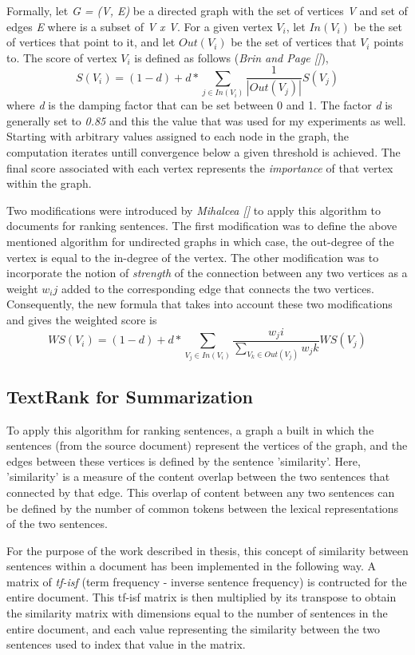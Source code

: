 Formally, let \emph{G = (V, E)} be a directed graph with the set of vertices \emph{V} and set of edges \emph{E} where is a subset of \emph{{V x V}}.
For a given vertex \(V_i\), let \(In(V_i)\) be the set of vertices that point to it, and let \(Out(V_i)\) be the set of vertices that \(V_i\) points to.
The score of vertex \(V_i\) is defined as follows (\emph{Brin and Page []}),
\[S(V_i) = (1 - d) + d * \sum_{j \in In(V_i)} \frac{1}{|Out(V_j)|}S(V_j)\]
where \emph{d} is the damping factor that can be set between 0 and 1.
The factor \emph{d} is generally set to \emph{0.85} and this the value that was used for my experiments as well.
Starting with arbitrary values assigned to each node in the graph, the computation iterates untill convergence below a given threshold is achieved.
The final score associated with each vertex represents the \textit{importance} of that vertex within the graph.

Two modifications were introduced by \emph{Mihalcea []} to apply this algorithm to documents for ranking sentences.
The first modification was to define the above mentioned algorithm for undirected graphs in which case, the out-degree of the vertex is equal to the in-degree of the vertex.
The other modification was to incorporate the notion of \textit{strength} of the connection between any two vertices as a weight \(w_ij\) added to the corresponding edge that connects the two vertices.
Consequently, the new formula that takes into account these two modifications and gives the weighted score is
\[WS(V_i) = (1 - d) + d * \sum_{V_j \in In(V_i)} \frac{w_ji}{\sum_{V_k \in Out(V_j)}w_jk}WS(V_j)\]

\subsection{TextRank for Summarization}
To apply this algorithm for ranking sentences, a graph a built in which the sentences (from the source document) represent the vertices of the graph, and the edges between these vertices is defined by the sentence 'similarity'.
Here, 'similarity' is a measure of the content overlap between the two sentences that connected by that edge.
This overlap of content between any two sentences can be defined by the number of common tokens between the lexical representations of the two sentences.

For the purpose of the work described in thesis, this concept of similarity between sentences within a document has been implemented in the following way.
A matrix of \emph{tf-isf} (term frequency - inverse sentence frequency) is contructed for the entire document.
This tf-isf matrix is then multiplied by its transpose to obtain the similarity matrix with dimensions equal to the number of sentences in the entire document, and each value representing the similarity between the two sentences used to index that value in the matrix.

